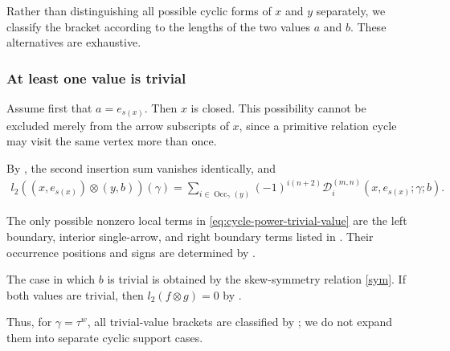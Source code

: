 \documentclass[11pt,a4paper,reqno]{amsart}
\newcommand{\mD}{\mathcal D}
\newcommand{\Occ}{\operatorname{Occ}}
\newcommand{\para}[2]{(#1,#2)}
\theoremstyle{plain}
\theoremstyle{definition}
\numberwithin{equation}{section}
\begin{document}
	Rather than distinguishing all possible cyclic forms of $x$ and $y$
	separately, we classify the bracket according to the lengths of the two
	values $a$ and $b$.  These alternatives are exhaustive.
	\subsubsection{At least one value is trivial}
	Assume first that $a=e_{s(x)}$.
	Then $x$ is closed.  This possibility cannot be excluded merely
	from the arrow subscripts of $x$, since a primitive relation cycle may visit
	the same vertex more than once.
	
	By , the second insertion sum vanishes
	identically, and
	\begin{align}
		l_2(
		\para{x}{e_{s(x)}}
		\otimes
		\para{y}{b}
		)(\gamma)
		=
		\sum_{i\in\Occ_\gamma(y)}
		(-1)^{i(n+2)}
		\mD_i^{(m,n)}
		(x,e_{s(x)};\gamma;b).
		\label{eq:cycle-power-trivial-value}
	\end{align}
	
	The only possible nonzero local terms in
	\eqref{eq:cycle-power-trivial-value} are the left boundary, interior
	single-arrow, and right boundary terms listed in
	.  Their occurrence positions and signs are
	determined by .
	
	The case in which $b$ is trivial is obtained by the skew-symmetry relation
	\eqref{sym}.  If both values are trivial, then $l_2(f\otimes g)=0$ by
	.
	
	Thus, for $\gamma=\tau^w$, all trivial-value brackets are classified by
	; we do not expand
	them into separate cyclic support cases.
	
\end{document}
